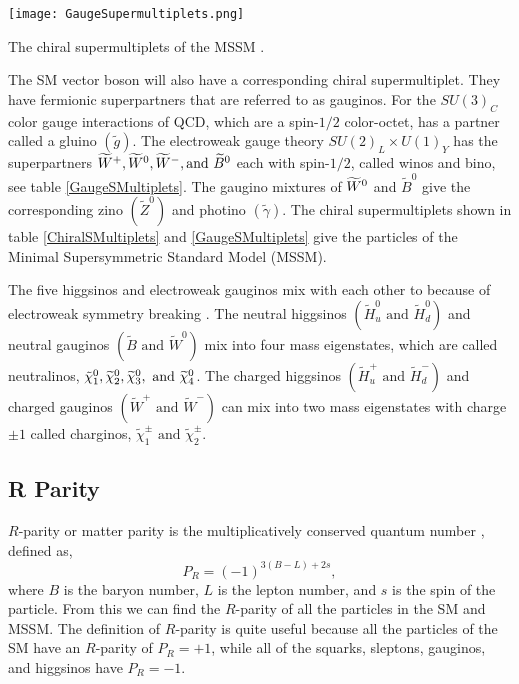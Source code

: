 \begin{table}
 	\centering
	\texttt{[image: GaugeSupermultiplets.png]}
 	\caption[Chiral supermultiplets for gauge bosons]{The chiral supermultiplets of the MSSM \cite{martin_supersymmetry_1997}.}
 	\label{GaugeSMultiplets} 
\end{table}

The SM vector boson will also have a corresponding chiral supermultiplet. They have fermionic superpartners that are referred to as gauginos. For the $SU(3)_C$ color gauge interactions of QCD, which are a spin-$1/2$ color-octet, has a partner called a gluino $(\widetilde{g})$. The electroweak gauge theory $SU(2)_L\times U(1)_Y$ has the superpartners $\widetilde{W}^+,\widetilde{W}^0, \widetilde{W}^-, \text{and } \widetilde{B}^0$ each with spin-$1/2$, called winos and bino, see table \ref{GaugeSMultiplets}. The gaugino mixtures of $\widetilde{W}^0$ and $\widetilde{B}^0$ give the corresponding zino $(\widetilde{Z}^0)$ and photino $(\widetilde{\gamma})$. The chiral supermultiplets shown in table \ref{ChiralSMultiplets} and \ref{GaugeSMultiplets} give the particles of the Minimal Supersymmetric Standard Model (MSSM). 

The five higgsinos and electroweak gauginos mix with each other to because of electroweak symmetry breaking \cite{martin_supersymmetry_1997}. The neutral higgsinos $(\widetilde{H}_u^0 \text{ and } \widetilde{H}_d^0)$ and neutral gauginos $(\widetilde{B} \text{ and } \widetilde{W}^0)$ mix into four mass eigenstates, which are called neutralinos, $\tilde{\chi}^{0}_{1}, \widetilde{\chi}^0_2, \widetilde{\chi}^0_3, \text{ and }\widetilde{\chi}^0_4$. The charged higgsinos $(\widetilde{H}_u^+ \text{ and } \widetilde{H}_d^-)$ and charged gauginos $(\widetilde{W}^+\text{ and } \widetilde{W}^-)$ can mix into two mass eigenstates with charge $\pm1$ called charginos,  $\widetilde{\chi}^\pm_1 \text{ and } \widetilde{\chi}^\pm_2$. 

\subsection{R Parity}
\label{subsec:rparity}

$R$-parity or matter parity is the multiplicatively conserved quantum number \cite{wess_supergauge_1974}, \cite{farrar_phenomenology_1978} defined as, 
\begin{equation} \label{RParity}
P_R=(-1)^{3(B-L)+2s}, 
\end{equation}
where $B$ is the baryon number, $L$ is the lepton number, and $s$ is the spin of the particle. From this we can find the $R$-parity of all the particles in the SM and MSSM. The definition of $R$-parity is quite useful because all the particles of the SM have an $R$-parity of $P_R=+1$, while all of the squarks, sleptons, gauginos, and higgsinos have $P_R=-1$.

